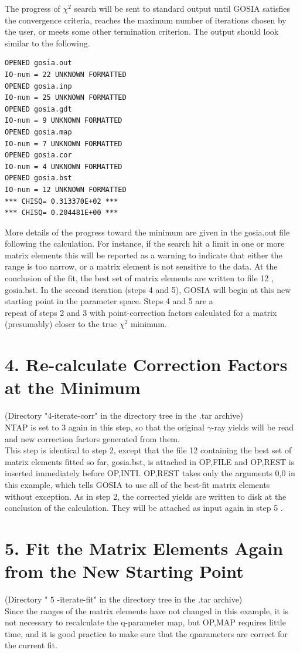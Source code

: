 \documentclass[10pt]{article}
\begin{document}
The progress of $\chi^{2}$ search will be sent to standard output until GOSIA satisfies the convergence criteria, reaches the maximum number of iterations chosen by the user, or meets some other termination criterion. The output should look similar to the following.

\begin{verbatim}
OPENED gosia.out
IO-num = 22 UNKNOWN FORMATTED
OPENED gosia.inp
IO-num = 25 UNKNOWN FORMATTED
OPENED gosia.gdt
IO-num = 9 UNKNOWN FORMATTED
OPENED gosia.map
IO-num = 7 UNKNOWN FORMATTED
OPENED gosia.cor
IO-num = 4 UNKNOWN FORMATTED
OPENED gosia.bst
IO-num = 12 UNKNOWN FORMATTED
*** CHISQ= 0.313370E+02 ***
*** CHISQ= 0.204481E+00 ***
\end{verbatim}

More details of the progress toward the minimum are given in the gosia.out file following the calculation. For instance, if the search hit a limit in one or more matrix elements this will be reported as a warning to indicate that either the range is too narrow, or a matrix element is not sensitive to the data. At the conclusion of the fit, the best set of matrix elements are written to file 12 , gosia.bst. In the second iteration (steps 4 and 5), GOSIA will begin at this new starting point in the parameter space. Steps 4 and 5 are a\\
repeat of steps 2 and 3 with point-correction factors calculated for a matrix (presumably) closer to the true $\chi^{2}$ minimum.

\section*{4. Re-calculate Correction Factors at the Minimum}
(Directory "4-iterate-corr" in the directory tree in the .tar archive)\\
NTAP is set to 3 again in this step, so that the original $\gamma$-ray yields will be read and new correction factors generated from them.\\
This step is identical to step 2, except that the file 12 containing the best set of matrix elements fitted so far, gosia.bst, is attached in OP,FILE and OP,REST is inserted immediately before OP,INTI. OP,REST takes only the arguments 0,0 in this example, which tells GOSIA to use all of the best-fit matrix elements without exception. As in step 2, the corrected yields are written to disk at the conclusion of the calculation. They will be attached as input again in step 5 .

\section*{5. Fit the Matrix Elements Again from the New Starting Point}
(Directory " 5 -iterate-fit" in the directory tree in the .tar archive)\\
Since the ranges of the matrix elements have not changed in this example, it is not necessary to recalculate the q-parameter map, but OP,MAP requires little time, and it is good practice to make sure that the qparameters are correct for the current fit.
\end{document}
